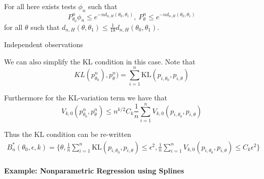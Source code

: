 \begin{lemma}
For all here exists tests $\phi_n$ such that 
$$
P_{\theta_0}^n \phi_n \leq e^{-nd_{n,H}(\theta_0,\theta_1)},~  P_{\theta}^n \leq e^{-nd_{n,H}(\theta_0,\theta_1)}
$$
for all $\theta$ such that $d_{n,H}(\theta,\theta_1) \leq \tfrac{1}{18} d_{n,H}(\theta_0,\theta_1)$.
\end{lemma}








{Independent observations}

We can also simplify the KL condition in this case.  Note that 
$$
KL(p^n_{\theta_0}),p^n_{\theta}) = \sum_{i=1}^n \text{KL}(p_{i,\theta_0},p_{i,\theta})
$$ 

Furthermore for the KL-variation term we have that 
$$
V_{k,0}(p^n_{\theta_0},p^n_\theta) \leq n^{k/2} C_k \frac{1}{n}\sum_{i=1}^n V_{k,0}(p_{i,\theta_0},p_{i,\theta}) 
$$

Thus the KL condition can be re-written
\begin{multline*}
B_n^*(\theta_0,\epsilon,k) = \Big\{\theta ,\frac{1}{n} \sum_{i=1}^n \text{KL}(p_{i,\theta_0},p_{i,\theta}) \leq \epsilon^2 , \frac{1}{n} \sum_{i=1}^n V_{k,0}(p_{i,\theta_0},p_{i,\theta})  \leq C_k \epsilon^2 \Big\}
\end{multline*}






\paragraph{Example: Nonparametric Regression using Splines}



% 





